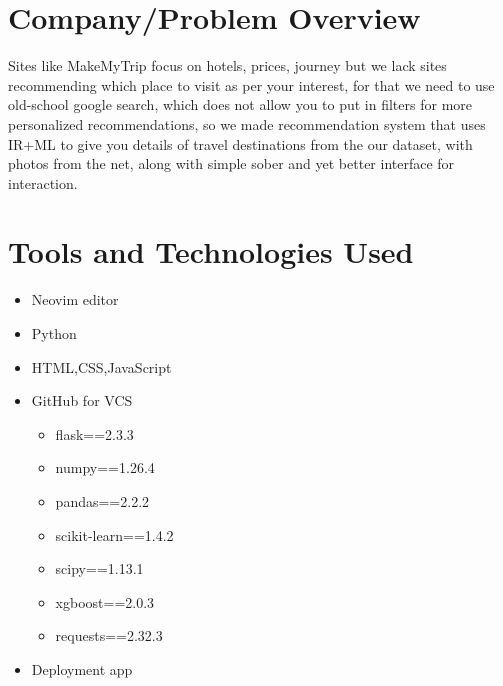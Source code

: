\documentclass[12pt,a4paper]{article}
\begin{document}
\newpage
\section{Company/Problem Overview}
Sites like MakeMyTrip focus on hotels, prices, journey but we lack sites recommending which place to visit as per your interest, for that we need to use old-school google search, which does not allow you to put in filters for more personalized recommendations, so we made recommendation system that uses IR+ML to give you details of travel destinations from the our dataset, with photos from the net,  along with simple sober and yet better interface for interaction.

\newpage
\section{Tools and Technologies Used}
\begin{itemize}
  \item Neovim editor
  \item Python
  \item HTML,CSS,JavaScript
  \item GitHub for VCS
      \begin{itemize}
          
            \item flask==2.3.3
                          
            \item numpy==1.26.4
              
            \item pandas==2.2.2
            \item scikit-learn==1.4.2
            \item scipy==1.13.1
          \item xgboost==2.0.3
          \item requests==2.32.3
      \end{itemize}
  \item Deployment app
\end{itemize}

\newpage
\end{document}
